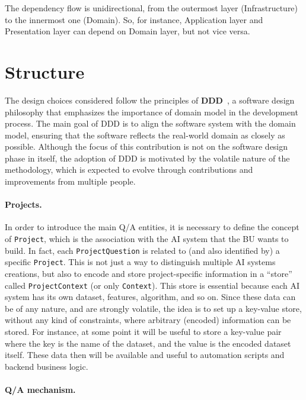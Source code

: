 \documentclass[12pt,a4paper,openright,twoside]{book}
\begin{document}
% 
The dependency flow is unidirectional, from the outermost layer (Infrastructure) to the innermost one (Domain).
%
So, for instance, Application layer and Presentation layer can depend on Domain layer, but not vice versa.
%

\section{Structure}
%
The design choices considered follow the principles of \textbf{\acf{DDD}}~\cite{millett2015ddd}, a software design philosophy that emphasizes the importance of domain model in the development process.
%
The main goal of \ac{DDD} is to align the software system with the domain model, ensuring that the software reflects the real-world domain as closely as possible.
%
Although the focus of this contribution is not on the software design phase in itself, the adoption of \ac{DDD} is motivated by the volatile nature of the methodology, which is expected to evolve through contributions and improvements from multiple people.


\paragraph{Projects.}
In order to introduce the main \ac{Q/A} entities, it is necessary to define the concept of \texttt{Project}, which is the association with the \ac{AI} system that the \ac{BU} wants to build.
%
In fact, each \texttt{ProjectQuestion} is related to (and also identified by) a specific \texttt{Project}.
%
This is not just a way to distinguish multiple AI systems creations, but also to encode and store project-specific information in a ``store'' called \texttt{ProjectContext} (or only \texttt{Context}).
%
This store is essential because each \ac{AI} system has its own dataset, features, algorithm, and so on.
%
Since these data can be of any nature, and are strongly volatile, the idea is to set up a key-value store, without any kind of constraints, where arbitrary (encoded) information can be stored.
%
For instance, at some point it will be useful to store a key-value pair where the key is the name of the dataset, and the value is the encoded dataset itself.
%
These data then will be available and useful to automation scripts and backend business logic.


\paragraph{\ac{Q/A} mechanism.}
\end{document}

